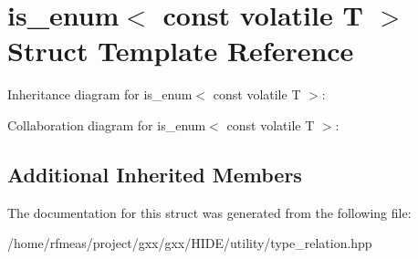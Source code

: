 \hypertarget{structis__enum_3_01const_01volatile_01T_01_4}{}\section{is\+\_\+enum$<$ const volatile T $>$ Struct Template Reference}
\label{structis__enum_3_01const_01volatile_01T_01_4}


Inheritance diagram for is\+\_\+enum$<$ const volatile T $>$\+:


Collaboration diagram for is\+\_\+enum$<$ const volatile T $>$\+:
\subsection*{Additional Inherited Members}


The documentation for this struct was generated from the following file\+:\begin{DoxyCompactItemize}
\item 
/home/rfmeas/project/gxx/gxx/\+H\+I\+D\+E/utility/type\+\_\+relation.\+hpp\end{DoxyCompactItemize}
